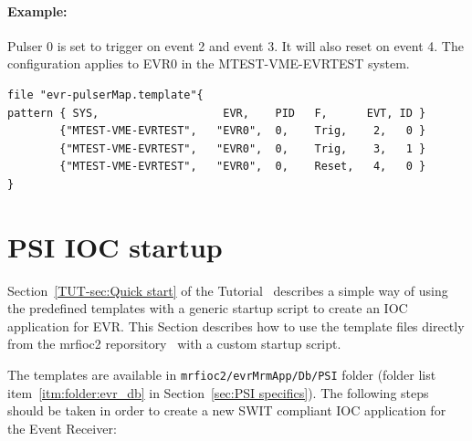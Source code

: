 \documentclass[12pt,a4paper]{article}
\let\stdsection\section
\renewcommand\section{\newpage\stdsection}
\begin{document}
\paragraph{Example:} Pulser 0 is set to trigger on event 2 and event 3. It will also
reset on event 4. The configuration applies to EVR0 in the MTEST-VME-EVRTEST system.

\begin{verbatim}
file "evr-pulserMap.template"{
pattern { SYS,                   EVR,    PID   F,      EVT, ID }
        {"MTEST-VME-EVRTEST",   "EVR0",  0,    Trig,    2,   0 }
        {"MTEST-VME-EVRTEST",   "EVR0",  0,    Trig,    3,   1 }
        {"MTEST-VME-EVRTEST",   "EVR0",  0,    Reset,   4,   0 }
}
\end{verbatim}


\section{PSI IOC startup}\label{sec:PSI IOC startup}
Section~\ref{TUT-sec:Quick start} of the Tutorial~\cite{tutorial} describes a simple way of using the predefined templates with a generic startup script to create an IOC application for EVR. This Section describes how to use the template files directly from the mrfioc2 reporsitory~\cite{git_mrfioc2} with a custom startup script.

The templates are available in \texttt{mrfioc2/evrMrmApp/Db/PSI} folder (folder list item~\ref{itm:folder:evr_db} in Section~\ref{sec:PSI specifics}). The following steps should be taken in order to create a new SWIT compliant IOC application for the Event Receiver:
\end{document}
